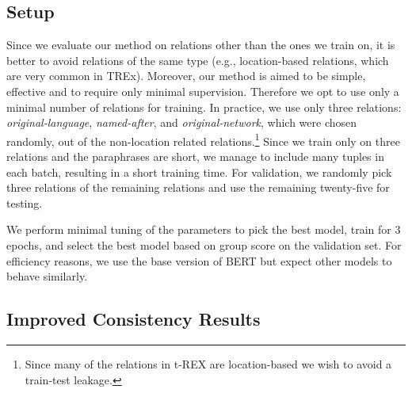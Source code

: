 
\subsection{Setup}


Since we evaluate our method on relations other than the
ones we train on, it is better to avoid relations of the same
type (e.g., location-based relations, which are very common
in TREx).  Moreover, our method is aimed to be simple,
effective and to require only minimal supervision. Therefore
we opt to use only a minimal number of relations for
training.  In practice, we use only three relations:
\textit{original-language}, \textit{named-after}, and
\textit{original-network}, which were chosen randomly, out of
the non-location related relations.\footnote{Since many of
  the relations in t-REX are location-based we wish to avoid
  a train-test leakage.}  Since we train only on three
relations and the paraphrases are short, we manage to
include many tuples in each batch, resulting in a short
training time.  For validation, we randomly pick three
relations of the remaining relations and use the remaining
twenty-five for testing.

We perform minimal tuning of the parameters to pick the best model, train for 3 epochs, and select the best model based on  group score on the validation set.
For efficiency reasons, we use the base version of BERT but expect other models to behave similarly.



\subsection{Improved Consistency Results}



